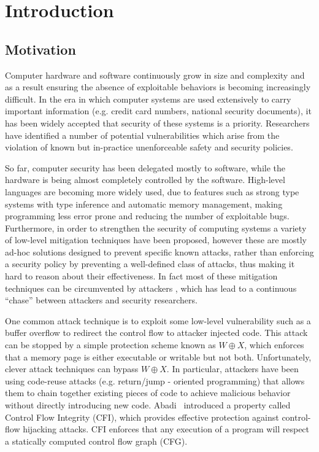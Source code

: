 \chapter{Introduction}\label{ch:introduction}

\section{Motivation}\label{sec:motivation}

Computer hardware and software continuously grow in size and complexity and as a
result ensuring the absence of exploitable behaviors is becoming increasingly
difficult. In the era in which computer systems are used extensively to
carry important information (e.g. credit card numbers, national security
documents), it has been widely accepted that security of these systems is a
priority. Researchers have identified a number of potential vulnerabilities
which arise from the violation of known but in-practice unenforceable safety
and security policies.

So far, computer security has been delegated mostly to software, while
the hardware is being almost completely controlled by the software.
High-level languages are becoming more widely used, due to features
such as strong type systems with type inference and automatic memory
management, making programming less error prone and reducing the
number of exploitable bugs. Furthermore, in order to strengthen the
security of computing systems a variety of low-level mitigation
techniques \cite{Cowan:1998:SAA:1267549.1267554,PaX,Erlingsson07}
have been proposed, however these are mostly ad-hoc solutions designed
to prevent specific known attacks, rather than enforcing a security
policy by preventing a well-defined class of attacks, thus making it
hard to reason about their effectiveness. In fact most of these
mitigation techniques can be circumvented by attackers
\cite{Szekeres2013}, which has lead to a continuous ``chase'' between
attackers and security researchers.

One common attack technique is to exploit some low-level vulnerability
such as a buffer overflow to redirect the control flow to attacker
injected code. This attack can be stopped by a simple protection
scheme known as $W \oplus X$, which enforces that a memory page is
either executable or writable but not both.  Unfortunately, clever
attack techniques can bypass $W \oplus X$. In particular, attackers
have been using code-reuse attacks (e.g. return/jump - oriented
programming) that allows them to chain together existing pieces of
code to achieve malicious behavior without directly introducing new
code.  Abadi~\ETAL\cite{abadi2005} introduced a property called
Control Flow Integrity (CFI), which provides effective protection
against control-flow hijacking attacks.  CFI enforces that any
execution of a program will respect a statically computed control flow
graph (CFG).  

